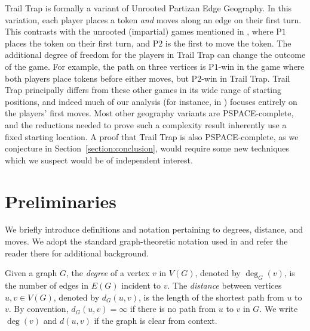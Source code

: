 \documentclass{article}
\theoremstyle{plain}
\theoremstyle{definition}
\def\pone{{\rm{P}\ensuremath{1}}}
\def\ptwo{{\rm{P}\ensuremath{2}}}
\begin{document}
{\sc Trail Trap} is formally a variant of {\sc Unrooted Partizan Edge Geography}. In this variation, each player places a token \emph{and} moves along an edge on their first turn. This contrasts with the unrooted (impartial) games mentioned in \cite{FSU93}, where \pone{} places the token on their first turn, and \ptwo{} is the first to move the token. The additional degree of freedom for the players in {\sc Trail Trap} can change the outcome of the game. For example, the path on three vertices is \pone{}-win in the game where both players place tokens before either moves, but \ptwo{}-win in {\sc Trail Trap}. {\sc Trail Trap} principally differs from these other games in its wide range of starting positions, and indeed much of our analysis (for instance, in ) focuses entirely on the players' first moves. Most other geography variants are PSPACE-complete, and the reductions needed to prove such a complexity result inherently use a fixed starting location. A proof that Trail Trap is also PSPACE-complete, as we conjecture in Section~\ref{section:conclusion}, would require some new techniques which we suspect would be of independent interest.

\section{Preliminaries}\label{sec preliminaries} 

We briefly introduce definitions and notation pertaining to degrees, distance, and moves. We adopt the standard graph-theoretic notation used in \cite{Diestel} and refer the reader there for additional background. 

Given a graph $G$, the \emph{degree} of a vertex $v$ in $V(G)$, denoted by $\deg_G(v)$, is the number of edges in $E(G)$ incident to $v$. The \emph{distance} between vertices $u, v \in V(G)$, denoted by $d_G(u,v)$, is the length of the shortest path from $u$ to $v$. By convention, $d_G(u,v) = \infty$ if there is no path from $u$ to $v$ in $G$. We write $\deg(v)$ and $d(u,v)$ if the graph is clear from context. 
\end{document}
